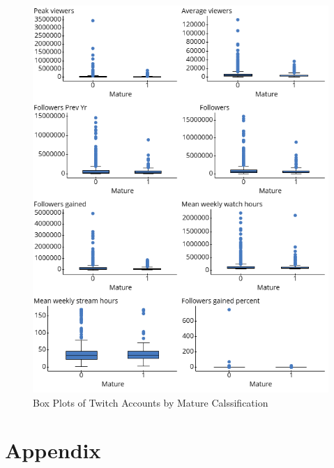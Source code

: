 \documentclass[12pt]{article}
\begin{document}
\begin{figure}[H]
  \centering %
  \includegraphics[width=0.8\linewidth]{../StatCrunch_Results/mature/box_plots}
  \captionsetup{justification=centering, singlelinecheck=false, margin=2cm}
  \caption[Box Plots of Twitch Accounts by Mature Calssification]{Box Plots of Twitch Accounts by Mature Calssification}
  \label{fig:box_plots_mature}
\end{figure}



\newpage

\section{Appendix}
\end{document}
